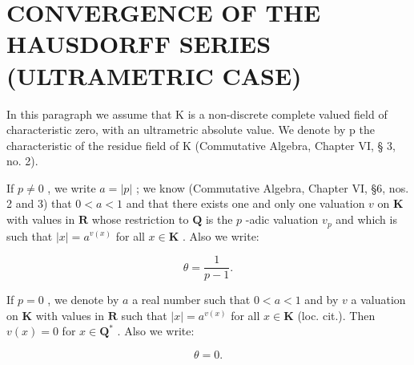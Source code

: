 \section{CONVERGENCE OF THE HAUSDORFF SERIES (ULTRAMETRIC CASE)}

In this paragraph we assume that K is a non-discrete complete valued field of characteristic zero, with an ultrametric absolute value. We denote by p the characteristic of the residue field of K (Commutative Algebra, Chapter VI, § 3, no. 2).

If \(p \neq 0\) , we write \(a = |p|\) ; we know (Commutative Algebra, Chapter VI, §6, nos. 2 and 3) that \(0 < a < 1\) and that there exists one and only one valuation \(v\) on \(\mathbf{K}\) with values in \(\mathbf{R}\) whose restriction to \(\mathbf{Q}\) is the \(p\) -adic valuation \(v_p\) and which is such that \(|x| = a^{v(x)}\) for all \(x \in \mathbf{K}\) . Also we write:

\[
\theta = \frac {1}{p - 1}.\tag{1}
\]

If \(p = 0\) , we denote by \(a\) a real number such that \(0 < a < 1\) and by \(v\) a valuation on \(\mathbf{K}\) with values in \(\mathbf{R}\) such that \(|x| = a^{v(x)}\) for all \(x \in \mathbf{K}\) (loc. cit.). Then \(v(x) = 0\) for \(x \in \mathbf{Q}^*\) . Also we write:

\[
\theta = 0.\tag{2}
\]

